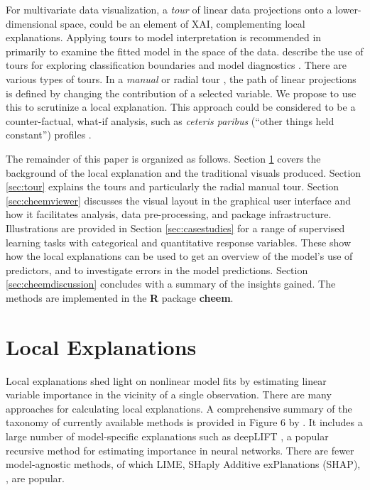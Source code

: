 \documentclass[
]{jss}
\begin{document}
For multivariate data visualization, a \emph{tour} \citep{asimov_grand_1985, buja_grand_1986, lee_state_2021} of linear data projections onto a lower-dimensional space, could be an element of XAI, complementing local explanations.
Applying tours to model interpretation is recommended in \citet{wickham_visualizing_2015} primarily to examine the fitted model in the space of the data. \citet{cook_interactive_2007} describe the use of tours for exploring classification boundaries and model diagnostics \citep{Caragea2008, lee_pptree_2013, da_silva_projection_2021}.
There are various types of tours. In a \emph{manual} or radial tour \citep{cook_manual_1997, spyrison_spinifex_2020}, the path of linear projections is defined by changing the contribution of a selected variable. We propose to use this to scrutinize a local explanation.
This approach could be considered to be a counter-factual, what-if analysis, such as \emph{ceteris paribus} (``other things held constant'') profiles \citep{biecek_ceterisparibus_2020}.

The remainder of this paper is organized as follows. Section \ref{sec:explanations} covers the background of the local explanation and the traditional visuals produced. Section \ref{sec:tour} explains the tours and particularly the radial manual tour. Section \ref{sec:cheemviewer} discusses the visual layout in the graphical user interface and how it facilitates analysis, data pre-processing, and package infrastructure. Illustrations are provided in Section \ref{sec:casestudies} for a range of supervised learning tasks with categorical and quantitative response variables. These show how the local explanations can be used to get an overview of the model's use of predictors, and to investigate errors in the model predictions. Section \ref{sec:cheemdiscussion} concludes with a summary of the insights gained. The methods are implemented in the \textbf{R} package \textbf{cheem}.

\hypertarget{sec:explanations}{%
\section{Local Explanations}\label{sec:explanations}}

Local explanations shed light on nonlinear model fits by estimating linear variable importance in the vicinity of a single observation. There are many approaches for calculating local explanations.
A comprehensive summary of the taxonomy of currently available methods is provided in Figure 6 by \citet{arrieta_explainable_2020}. It includes a large number of model-specific explanations such as deepLIFT \citep{shrikumar_not_2016, shrikumar_learning_2017}, a popular recursive method for estimating importance in neural networks. There are fewer model-agnostic methods, of which LIME, \citep{ribeiro_why_2016} SHaply Additive exPlanations (SHAP), \citep{lundberg_unified_2017}, are popular.
\end{document}
